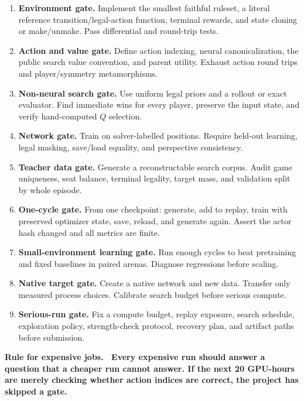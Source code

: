 \documentclass[10.5pt,letterpaper]{article}
\newcommand{\boxtitle}[1]{\sffamily\bfseries\color{deepblue}#1.\ }
\begin{document}
\begin{enumerate}
  \item \textbf{Environment gate.} Implement the smallest faithful ruleset, a
        literal reference transition/legal-action function, terminal rewards,
        and state cloning or make/unmake. Pass differential and round-trip
        tests.
  \item \textbf{Action and value gate.} Define action indexing, neural
        canonicalization, the public search value convention, and parent
        utility. Exhaust action round trips and player/symmetry metamorphisms.
  \item \textbf{Non-neural search gate.} Use uniform legal priors and a rollout
        or exact evaluator. Find immediate wins for every player, preserve the
        input state, and verify hand-computed $Q$ selection.
  \item \textbf{Network gate.} Train on solver-labelled positions.
        Require held-out learning, legal masking, save/load equality, and
        perspective consistency.
  \item \textbf{Teacher data gate.} Generate a reconstructable search
        corpus. Audit game uniqueness, seat balance, terminal legality, target
        mass, and validation split by whole episode.
  \item \textbf{One-cycle gate.} From one checkpoint: generate, add to replay,
        train with preserved optimizer state, save, reload, and generate again.
        Assert the actor hash changed and all metrics are finite.
  \item \textbf{Small-environment learning gate.} Run enough cycles to beat
        pretraining and fixed baselines in paired arenas. Diagnose regressions
        before scaling.
  \item \textbf{Native target gate.} Create a native network and new data.
        Transfer only measured process choices. Calibrate search budget before
        serious compute.
  \item \textbf{Serious-run gate.} Fix a compute budget, replay exposure, search
        schedule, exploration policy, strength-check protocol, recovery plan,
        and artifact paths before submission.
\end{enumerate}

\begin{keybox}
\boxtitle{Rule for expensive jobs}
Every expensive run should answer a question that a cheaper run cannot answer.
If the next 20 GPU-hours are merely checking whether action indices are correct,
the project has skipped a gate.
\end{keybox}
\end{document}

